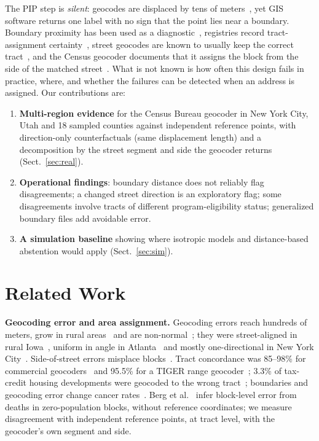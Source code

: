 \documentclass[runningheads]{llncs}
\begin{document}
The PIP step is \emph{silent}: geocodes are displaced by tens of meters~\cite{cayo2003,zandbergen2008,zandbergen2009}, yet GIS software returns one label with no sign that the point lies near a boundary. Boundary proximity has been used as a diagnostic~\cite{berg2026,whitsel2006}, registries record tract-assignment certainty~\cite{naaccr}, street geocodes are known to usually keep the correct tract~\cite{whitsel2006,brokamp2018,kinnee2020}, and the Census geocoder documents that it assigns the block from the side of the matched street~\cite{censusguide,censusaddr}. What is not known is how often this design fails in practice, where, and whether the failures can be detected when an address is assigned. Our contributions are:
\begin{enumerate}
\item \textbf{Multi-region evidence} for the Census Bureau geocoder in New York City, Utah and 18 sampled counties against independent reference points, with direction-only counterfactuals (same displacement length) and a decomposition by the street segment and side the geocoder returns (Sect.~\ref{sec:real}).
\item \textbf{Operational findings}: boundary distance does not reliably flag disagreements; a changed street direction is an exploratory flag; some disagreements involve tracts of different program-eligibility status; generalized boundary files add avoidable error.
\item \textbf{A simulation baseline} showing where isotropic models and distance-based abstention would apply (Sect.~\ref{sec:sim}).
\end{enumerate}

\section{Related Work}
\textbf{Geocoding error and area assignment.} Geocoding errors reach hundreds of meters, grow in rural areas~\cite{goldberg2007,cayo2003,zandbergen2008,zandbergen2009} and are non-normal~\cite{zandbergen2008b}; they were street-aligned in rural Iowa~\cite{zimmerman2007}, uniform in angle in Atlanta~\cite{strickland2007} and mostly one-directional in New York City~\cite{kinnee2020}. Side-of-street errors misplace blocks~\cite{eckman2012}. Tract concordance was 85--98\% for commercial geocoders~\cite{krieger2001,whitsel2006} and 95.5\% for a TIGER range geocoder~\cite{brokamp2018}; 3.3\% of tax-credit housing developments were geocoded to the wrong tract~\cite{wilson2024}; boundaries and geocoding error change cancer rates~\cite{goldberg2012}. Berg et al.~\cite{berg2026} infer block-level error from deaths in zero-population blocks, without reference coordinates; we measure disagreement with independent reference points, at tract level, with the geocoder's own segment and side.
\end{document}

